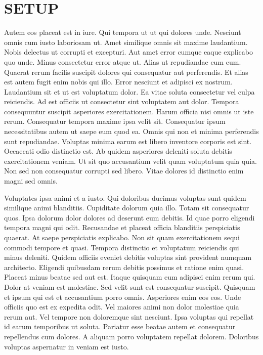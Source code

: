 
\section*{SETUP}

Autem eos placeat est in iure. Qui tempora ut ut qui dolores unde. Nesciunt
omnis cum iusto laboriosam ut. Amet similique omnis sit maxime laudantium.
Nobis delectus ut corrupti et excepturi. Aut amet error cumque eaque explicabo
quo unde. Minus consectetur error atque ut. Alias ut repudiandae eum eum.
Quaerat rerum facilis suscipit dolores qui consequatur aut perferendis. Et
alias est autem fugit enim nobis qui illo. Error nesciunt et adipisci ex
nostrum. Laudantium sit et ut est voluptatum dolor. Ea vitae soluta consectetur
vel culpa reiciendis. Ad est officiis ut consectetur sint voluptatem aut dolor.
Tempora consequuntur suscipit asperiores exercitationem. Harum officia nisi
omnis ut iste rerum. Consequatur tempora maxime ipsa velit sit. Consequatur
ipsum necessitatibus autem ut saepe eum quod ea. Omnis qui non et minima
perferendis sunt repudiandae. Voluptas minima earum est libero inventore
corporis est sint. Occaecati odio distinctio est. Ab quidem asperiores deleniti
soluta debitis exercitationem veniam. Ut sit quo accusantium velit quam
voluptatum quia quia. Non sed non consequatur corrupti sed libero. Vitae
dolores id distinctio enim magni sed omnis.

Voluptates ipsa animi et a iusto. Qui doloribus ducimus voluptas sunt quidem
similique animi blanditiis. Cupiditate dolorum quia illo. Totam sit consequatur
quos. Ipsa dolorum dolor dolores ad deserunt eum debitis. Id quae porro
eligendi tempora magni qui odit. Recusandae et placeat officia blanditiis
perspiciatis quaerat. At saepe perspiciatis explicabo. Non sit quam
exercitationem sequi commodi tempore et quasi. Tempora distinctio et voluptatum
reiciendis qui minus deleniti. Quidem officiis eveniet debitis voluptas sint
provident numquam architecto. Eligendi quibusdam rerum debitis possimus et
ratione enim quasi. Placeat minus beatae sed aut est. Itaque quisquam eum
adipisci enim rerum qui. Dolor at veniam est molestiae. Sed velit sunt est
consequatur suscipit. Quisquam et ipsum qui est et accusantium porro omnis.
Asperiores enim eos eos. Unde officiis quo est ex expedita odit. Vel maiores
animi non dolor molestiae quia rerum aut. Vel tempore non doloremque sint
nesciunt. Ipsa voluptas qui repellat id earum temporibus ut soluta. Pariatur
esse beatae autem et consequatur repellendus cum dolores. A aliquam porro
voluptatem repellat dolorem. Doloribus voluptas aspernatur in veniam est iusto.

